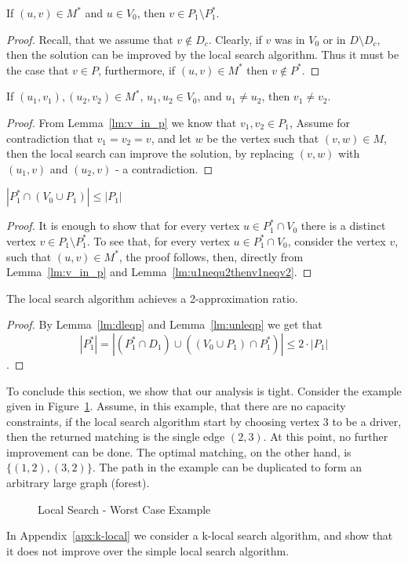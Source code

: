\begin{lemma}
\label{lm:v_in_p}
If $(u, v) \in M^*$ and $u \in V_0$, then $v \in P_1 \setminus P^*_1$.
\end{lemma}

\begin{proof}
Recall, that we assume that $v \notin D_c$.
Clearly, if $v$ was in $V_0$ or in $D \setminus D_c$, 
then the solution can be improved by the local search algorithm.
Thus it must be the case that $v \in P$, furthermore, 
if $(u, v) \in M^*$ then $v \notin P^*$. 
\end{proof}

\begin{lemma}
\label{lm:u1nequ2thenv1neqv2}
If $(u_1, v_1), (u_2, v_2) \in M^*$,
$u_1, u_2 \in V_0$, 
and $u_1 \neq u_2$,
then $v_1 \neq v_2$.
\end{lemma}

\begin{proof}
From Lemma~\ref{lm:v_in_p} we know that $v_1, v_2 \in P_1$,
Assume for contradiction that $v_1 = v_2 = v$,
and let $w$ be the vertex such that $(v, w) \in M$,
then the local search can improve the solution, 
by replacing $(v, w)$ with $(u_1, v)$ and $(u_2, v)$ - a contradiction.
\end{proof}

\begin{lemma}
\label{lm:unleqp}
$|P^*_1 \cap (V_0 \cup P_1)| \leq |P_1|$
\end{lemma}

\begin{proof}
It is enough to show that for every vertex $u \in P^*_1 \cap V_0$
there is a distinct vertex $v \in P_1 \setminus P^*_1$.
To see that, for every vertex $u \in P^*_1 \cap V_0$, 
consider the vertex $v$, such that $(u, v) \in M^*$, 
the proof follows, then, directly
from Lemma~\ref{lm:v_in_p} and Lemma~\ref{lm:u1nequ2thenv1neqv2}.  
\end{proof}


\begin{theorem}
\label{th:ls-2}
The local search algorithm achieves a 2-approximation ratio.
\end{theorem}

\begin{proof}
By Lemma~\ref{lm:dleqp} and Lemma~\ref{lm:unleqp} we get that 
$$
|P^*_1| = 
|(P^*_1 \cap D_1) \cup ((V_0 \cup P_1) \cap P^*_1)| \leq 2 \cdot |P_1|
$$.
\end{proof}

To conclude this section, we show that our analysis is tight.
Consider the example given in Figure~\ref{fig:localtight}.
Assume, in this example, that there are no capacity constraints,
if the local search algorithm start by choosing vertex $3$ to be a driver, 
then the returned matching is the single edge $(2,3)$.
At this point, no further improvement can be done.
The optimal matching, on the other hand, is $\{(1, 2), (3, 2)\}$. 
The path in the example can be duplicated to form an arbitrary large graph (forest).

\begin{figure} 

\caption{
\label{fig:localtight}
Local Search - Worst Case Example
}
\end{figure}

In Appendix~\ref{apx:k-local} we consider a k-local search algorithm, 
and show that it does not improve over the simple local search algorithm.